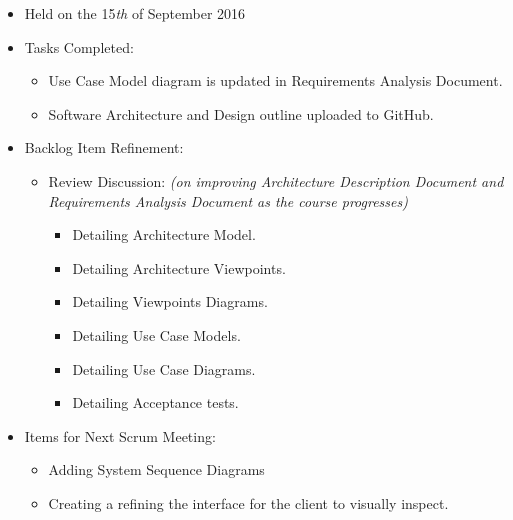 \documentclass[a4paper]{article}
\begin{document}
\begin{itemize}

\item Held on the 15\textit{th} of September 2016

\item Tasks Completed:

\begin{itemize}

\item Use Case Model diagram is updated in Requirements Analysis Document.

\item Software Architecture and Design outline uploaded to GitHub.

\end{itemize}

\item Backlog Item Refinement:

\begin{itemize}

\item Review Discussion: \emph{(on improving Architecture Description Document and Requirements Analysis Document as the course progresses)}

\begin{itemize}

\item Detailing Architecture Model.

\item Detailing Architecture Viewpoints.

\item Detailing Viewpoints Diagrams.

\item Detailing Use Case Models.

\item Detailing Use Case Diagrams.

\item Detailing Acceptance tests.

\end{itemize}

\end{itemize}

\item Items for Next Scrum Meeting:

\begin{itemize}

\item Adding System Sequence Diagrams

\item Creating a refining the interface for the client to visually inspect.


\end{itemize}
\end{itemize}
\end{document}
